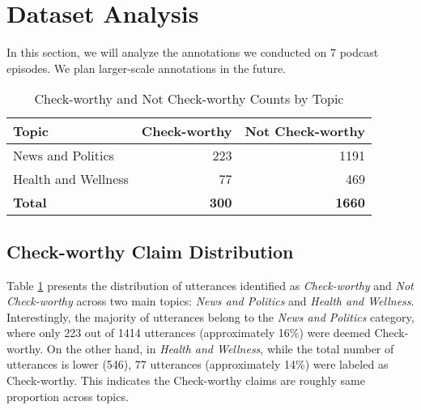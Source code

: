 \section{Dataset Analysis}

In this section, we will analyze the  annotations we conducted on 7 podcast episodes. We plan larger-scale annotations in the future.

\begin{table}[t!!!]
\centering
\caption{Check-worthy and Not Check-worthy Counts by Topic}
\label{tab:Check-worthy_counts}
\begin{tabular}{lrr}
\hline
\textbf{Topic}             & \textbf{Check-worthy} & \textbf{Not Check-worthy} \\ \hline
News and Politics          & 223                  & 1191                     \\ 
Health and Wellness        & 77                   & 469                      \\ 
\midrule
\textbf{Total}             & \textbf{300}         & \textbf{1660}            \\ \hline
\end{tabular}
\end{table}

\subsection{Check-worthy Claim Distribution}

Table \ref{tab:Check-worthy_counts} presents the distribution of utterances identified as \textit{Check-worthy} and \textit{Not Check-worthy} across two main topics: \textit{News and Politics} and \textit{Health and Wellness}. Interestingly, the majority of utterances belong to the \textit{News and Politics} category, where only 223 out of 1414 utterances (approximately 16\%) were deemed Check-worthy.  On the other hand, in \textit{Health and Wellness}, while the total number of utterances is lower (546), 77 utterances (approximately 14\%) were labeled as Check-worthy. This indicates the Check-worthy claims are roughly same proportion across topics.


